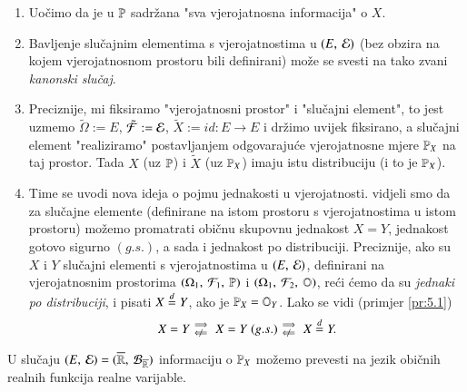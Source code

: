 \begin{nap} \label{nap:5.3}
    \begin{enumerate}[label=(\alph*)]
        \item Uo\v cimo da je u $\mathbb{P}$ sadr\v zana "sva vjerojatnosna informacija" o $X$.
        \item Bavljenje slu\v cajnim elementima s vjerojatnostima u $({E}, \: {\mathcal{E}})$ (bez obzira na kojem vjerojatnosnom prostoru bili definirani) mo\v ze se svesti na tako zvani \emph{kanonski slu\v caj}.
        \item Preciznije, mi fiksiramo "vjerojatnosni prostor" i "slu\v cajni element", to jest uzmemo $\tilde{\Omega} := E$, $\tilde{\mathcal{F}} := \mathcal{E}$, $\tilde{X} := id : E \to E$ i dr\v zimo uvijek fiksirano, a slu\v cajni element "realiziramo" postavljanjem odgovaraju\' ce vjerojatnosne mjere $\mathbb{P}_X$ na taj prostor.
        Tada $X$ (uz $\mathbb{P}$) i $\tilde{X}$ (uz $\mathbb{P}_X$) imaju istu distribuciju (i to je $\mathbb{P}_X$).
        \item Time se uvodi nova ideja o pojmu jednakosti u vjerojatnosti.
        vidjeli smo da za slu\v cajne elemente (definirane na istom prostoru s vjerojatnostima u istom prostoru) mo\v zemo promatrati obi\v cnu skupovnu jednakost $X = Y$, jednakost gotovo sigurno $(g.s.)$, a sada i jednakost po distribuciji.
        Preciznije, ako su $X$ i $Y$ slu\v cajni elementi s vjerojatnostima u $({E}, \: {\mathcal{E}})$, definirani na vjerojatnosnim prostorima $(\Omega_1, \: \mathcal{F}_1, \: \mathbb{P})$ i $(\Omega_1, \: \mathcal{F}_2, \: \mathbb{O})$, re\' ci \' cemo da su \emph{jednaki po distribuciji}, i pisati $X \overset{d}{=} Y$, ako je $\mathbb{P}_X = \mathbb{O}_Y$.
        Lako se vidi (primjer \ref{pr:5.1})
        \begin{equation*}
            X = Y
            \begin{smallmatrix}
                \implies&  \\
                \notimpliedby&
            \end{smallmatrix}
            X = Y \; (g.s.)
            \begin{smallmatrix}
                \implies&  \\
                \notimpliedby&
            \end{smallmatrix}
            X \distJed Y.
        \end{equation*}
    \end{enumerate}
\end{nap}

U slu\v caju $({E}, \: {\mathcal{E}}) = ({\overline{\mathbb{R}}}, \: {\mathcal{B}_{\overline{\mathbb{R}}}})$ informaciju o $\mathbb{P}_X$ mo\v zemo prevesti na jezik obi\v cnih realnih funkcija realne varijable.

